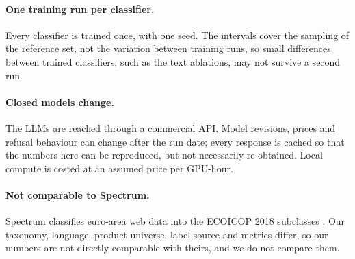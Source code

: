 \paragraph{One training run per classifier.} Every classifier is trained once, with one
seed. The intervals cover the sampling of the reference set, not the variation between
training runs, so small differences between trained classifiers, such as the text
ablations, may not survive a second run.

\paragraph{Closed models change.} The LLMs are reached through a commercial API. Model
revisions, prices and refusal behaviour can change after the run date; every response is
cached so that the numbers here can be reproduced, but not necessarily re-obtained. Local
compute is costed at an assumed price per GPU-hour.

\paragraph{Not comparable to Spectrum.} Spectrum classifies euro-area web data into the
ECOICOP 2018 subclasses \citep{bis2026spectrum}. Our taxonomy, language, product universe,
label source and metrics differ, so our numbers are not directly comparable with theirs,
and we do not compare them.
